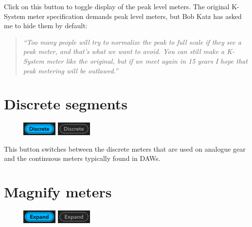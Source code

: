 Click on this button to toggle display of the peak level meters.  The
original K-System meter specification demands peak level meters, but
Bob Katz has asked me to hide them by default:

\begin{quotation}
  \emph{``Too many people will try to normalize the peak to full scale
    if they see a peak meter, and that's what we want to avoid.  You
    can still make a K-System meter like the original, but if we meet
    again in \num{15} years I hope that peak metering will be
    outlawed.''}
\end{quotation}

\section{Discrete segments}

\begin{figure}
\includegraphics[scale=\screenshotscale,clip]{include/images/button_discrete_on.png}
\newline \vspace{-0.9\baselineskip}
\includegraphics[scale=\screenshotscale,clip]{include/images/button_discrete_off.png}
\end{figure}

This button switches between the discrete meters that are used on
analogue gear and the continuous meters typically found in DAWs.

\section{Magnify meters}

\begin{figure}
\includegraphics[scale=\screenshotscale,clip]{include/images/button_expand_meter_on.png}
\newline \vspace{-0.9\baselineskip}
\includegraphics[scale=\screenshotscale,clip]{include/images/button_expand_meter_off.png}
\end{figure}

